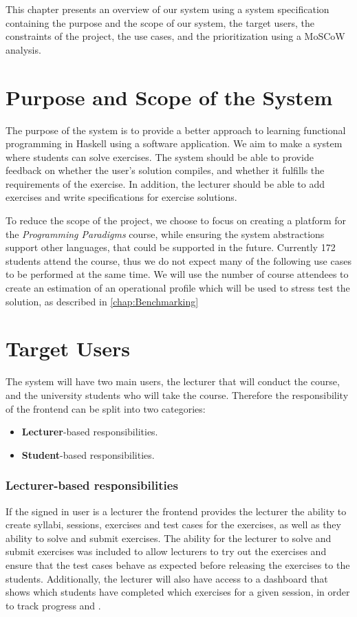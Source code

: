 This chapter presents an overview of our system using a system specification containing the purpose and the scope of our system, the target users, the constraints of the project, the use cases, and the prioritization using a MoSCoW analysis.

\section{Purpose and Scope of the System}
The purpose of the system is to provide a better approach to learning functional programming in Haskell using a software application.
We aim to make a system where students can solve exercises. The system should be able to provide feedback on whether the user's solution compiles, and whether it fulfills the requirements of the exercise.
In addition, the lecturer should be able to add exercises and write specifications for exercise solutions.

To reduce the scope of the project, we choose to focus on creating a platform for the \textit{Programming Paradigms} course, while ensuring the system abstractions support other languages, that could be supported in the future.
Currently 172 students attend the course, thus we do not expect many of the following use cases to be performed at the same time.
We will use the number of course attendees to create an estimation of an operational profile which will be used to stress test the solution, as described in \ref{chap:Benchmarking}

\section{Target Users}
The system will have two main users, the lecturer that will conduct the course, and the university students who will take the course.
Therefore the responsibility of the frontend can be split into two categories:
\begin{itemize}
    \item \textbf{Lecturer}-based responsibilities.
    \item \textbf{Student}-based responsibilities.
\end{itemize}

\subsubsection{Lecturer-based responsibilities}
If the signed in user is a lecturer the frontend provides the lecturer the ability to create syllabi, sessions, exercises and test cases for the exercises, as well as they ability to solve and submit exercises. The ability for the lecturer to solve and submit exercises was included to allow lecturers to try out the exercises and ensure that the test cases behave as expected before releasing the exercises to the students. Additionally, the lecturer will also have access to a dashboard that shows which students have completed which exercises for a given session, in order to track progress and .

